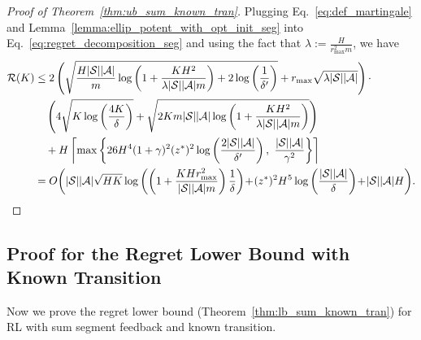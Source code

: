\begin{proof}[Proof of Theorem~\ref{thm:ub_sum_known_tran}]
	Plugging  Eq.~\eqref{eq:def_martingale} and Lemma~\ref{lemma:ellip_potent_with_opt_init_seg} into Eq.~\eqref{eq:regret_decomposition_seg} and using the fact that $\lambda:=\frac{H}{r_{\max}^2 m}$, we have
	\begin{align*}
		\cR(K) & \leq 2 \sbr{ \sqrt{\frac{H|\cS||\cA|}{m}\log\sbr{1+\frac{KH^2}{\lambda|\cS||\cA|m}} + 2\log\sbr{\frac{1}{\delta'}}} + r_{\max}\sqrt{\lambda|\cS||\cA|} } \cdot
		\\
		&\quad \sbr{ 4\sqrt{ K \log\sbr{\frac{4K}{\delta}} } + \sqrt{2Km |\cS| |\cA| \log \sbr{ 1+\frac{  KH^2 }{ \lambda |\cS| |\cA|m } }} } 
		\\ 
		&\quad + H \left\lceil \max\lbr{ 26H^4 (1+\gamma)^2 (z^*)^2  \log\sbr{\frac{2|\cS||\cA|}{\delta'}} ,\ \frac{|\cS||\cA|}{\gamma^2} } \right\rceil
		\\
		&= O\!\sbr{ |\cS| |\cA| \sqrt{HK} \log\sbr{\sbr{1+\frac{KH r_{\max}^2}{|\cS||\cA|m}}  \frac{1}{\delta}} \!+\!   (z^*)^2 H^5 \log\sbr{\frac{|\cS||\cA|}{\delta}} \!+\! |\cS||\cA|H } \!.
	\end{align*}
\end{proof}

\subsection{Proof for the Regret Lower Bound with Known Transition}

Now we prove the regret lower bound (Theorem~\ref{thm:lb_sum_known_tran}) for RL with sum segment feedback and known transition.


